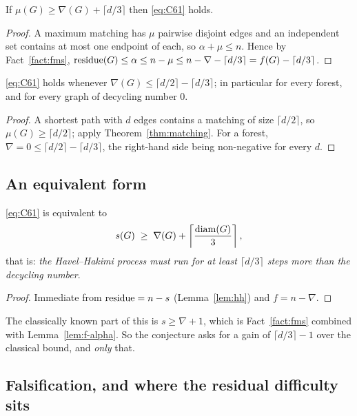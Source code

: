 \begin{theorem}\label{thm:matching}
\Selem
If $\mu(G) \ge \nabla(G) + \lceil d/3 \rceil$ then \eqref{eq:C61} holds.
\end{theorem}

\begin{proof}
A maximum matching has $\mu$ pairwise disjoint edges and an independent set contains at
most one endpoint of each, so $\alpha + \mu \le n$. Hence by Fact~\ref{fact:fms},
$\operatorname{residue}(G) \le \alpha \le n - \mu \le n - \nabla - \lceil d/3 \rceil
= f(G) - \lceil d/3 \rceil$.
\end{proof}

\begin{corollary}\label{cor:C1}
\Selem
\eqref{eq:C61} holds whenever $\nabla(G) \le \lceil d/2 \rceil - \lceil d/3 \rceil$; in
particular for every forest, and for every graph of decycling number $0$.
\end{corollary}

\begin{proof}
A shortest path with $d$ edges contains a matching of size $\lceil d/2 \rceil$, so
$\mu(G) \ge \lceil d/2 \rceil$; apply Theorem~\ref{thm:matching}. For a forest,
$\nabla = 0 \le \lceil d/2 \rceil - \lceil d/3 \rceil$, the right-hand side being
non-negative for every $d$.
\end{proof}

\subsection{An equivalent form}

\begin{theorem}\label{thm:equivform}
\Selem
\eqref{eq:C61} is equivalent to
\[
s(G) \;\ge\; \nabla(G) + \left\lceil \frac{\operatorname{diam}(G)}{3} \right\rceil,
\]
that is: \emph{the Havel--Hakimi process must run for at least $\lceil d/3 \rceil$ steps
more than the decycling number}.
\end{theorem}

\begin{proof}
Immediate from $\operatorname{residue} = n - s$ (Lemma~\ref{lem:hh}) and $f = n - \nabla$.
\end{proof}

The classically known part of this is $s \ge \nabla + 1$, which is Fact~\ref{fact:fms}
combined with Lemma~\ref{lem:f-alpha}. So the conjecture asks for a gain of
$\lceil d/3 \rceil - 1$ over the classical bound, and \emph{only} that.

\subsection{Falsification, and where the residual difficulty sits}
\label{sec:falsify}

